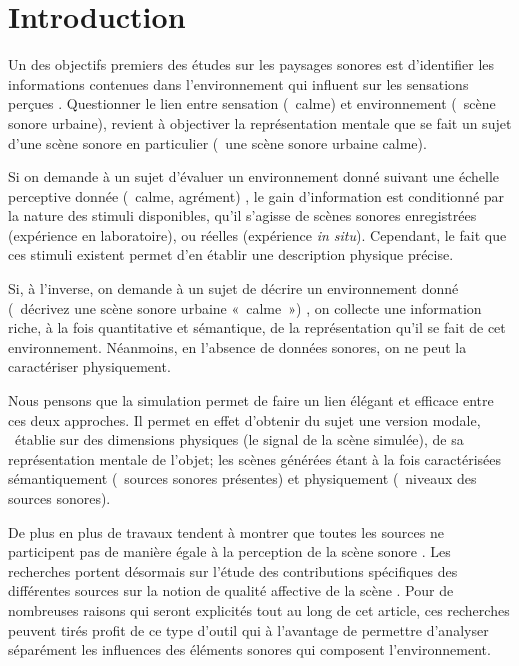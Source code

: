 \documentclass[twoside,twocolumn]{article}
\begin{document}

\setlength{\parindent}{5ex}

\section{Introduction}
\label{sec:intro}

Un des objectifs premiers des études sur les paysages sonores est d'identifier les informations contenues dans l'environnement qui influent sur les sensations perçues \cite{aletta2016soundscape}. Questionner le lien entre sensation (\eg~calme) et environnement (\eg~scène sonore urbaine), revient à objectiver la représentation mentale que se fait un sujet d'une scène sonore en particulier (\eg~une scène sonore urbaine calme).

Si on demande à un sujet d'évaluer un environnement donné suivant une échelle perceptive donnée (\eg~calme, agrément) \cite{axelsson2005soundscape,davies2013perception,cain2013development}, le gain d'information est conditionné par la nature des stimuli disponibles, qu'il s'agisse de scènes sonores enregistrées (expérience en laboratoire), ou réelles (expérience \emph{in situ}). Cependant, le fait que ces stimuli existent permet d'en établir une description physique précise.

Si, à l'inverse, on demande à un sujet de décrire un environnement donné (\eg~décrivez une scène sonore urbaine «~calme~») \cite{guastavino2006ideal, dubois2006cognitive}, on collecte une information riche, à la fois quantitative et sémantique, de la représentation qu'il se fait de cet environnement. Néanmoins, en l'absence de données sonores, on ne peut la caractériser physiquement.

Nous pensons que la simulation permet de faire un lien élégant et efficace entre ces deux approches. Il permet en effet d'obtenir du sujet une version modale, \ie~établie sur des dimensions physiques (le signal de la scène simulée), de sa représentation mentale de l'objet; les scènes générées étant à la fois caractérisées sémantiquement (\eg~sources sonores présentes) et physiquement (\eg~niveaux des sources sonores).

De plus en plus de travaux tendent à montrer que toutes les sources ne participent pas de manière égale à la perception de la scène sonore \cite{defreville2004aactivity,lavandier2006contribution,guastavino2006ideal,nilsson2007soundscape,
szeremeta2009analysis}. Les recherches portent désormais sur l'étude des contributions spécifiques des différentes sources sur la notion de qualité affective de la scène \cite{gozalo2015relationship,ricciardi2015sound}. Pour de nombreuses raisons qui seront explicités tout au long de cet article, ces recherches peuvent tirés profit de ce type d'outil qui à l'avantage de permettre d'analyser séparément les influences des éléments sonores qui composent l'environnement.
\end{document}
